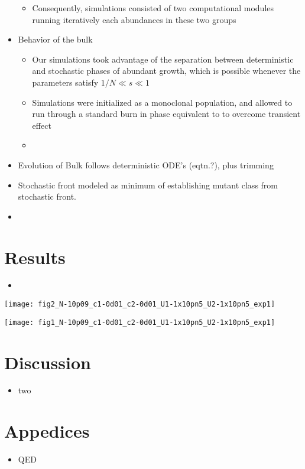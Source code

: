 \documentclass[12pt,one column]{article}
\begin{document}
\begin{itemize}
\begin{itemize}
		\item Consequently, simulations consisted of two computational modules running iteratively each  abundances in these two groups
	\end{itemize}
	\item Behavior of the bulk
	\begin{itemize}
		\item Our simulations took advantage of the separation between deterministic and stochastic phases of abundant growth, which is possible whenever the parameters satisfy $1/N \ll s \ll 1$ 
		\item Simulations were initialized as a monoclonal population, and allowed to run through a standard burn in phase equivalent to  to overcome transient effect 
		\item 
	\end{itemize}
	\item Evolution of Bulk follows deterministic ODE's (eqtn.?), plus trimming
	\item Stochastic front modeled as minimum of establishing mutant class from stochastic front.
	\item 
\end{itemize}



\section*{Results}
\begin{itemize}
	\item 
\end{itemize}

{\centering
\texttt{[image: fig2\_N-10p09\_c1-0d01\_c2-0d01\_U1-1x10pn5\_U2-1x10pn5\_exp1]}
\label{fig.1}}

{\centering
\texttt{[image: fig1\_N-10p09\_c1-0d01\_c2-0d01\_U1-1x10pn5\_U2-1x10pn5\_exp1]}
\label{fig.2}}

\section*{Discussion}
\begin{itemize}
	\item two
\end{itemize}






\section*{Appedices}
\begin{itemize}
	\item QED
\end{itemize}
\end{document}
